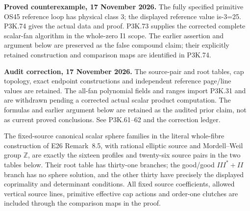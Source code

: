 \begin{theorem}\label{night:P3F.53}
\par\noindent\textbf{Proved counterexample, 17 November 2026.} The fully specified primitive OS45 reference loop has physical class 3; the displayed reference value is-3=25. P3K.74 gives the actual data and proof. P3K.73 supplies the corrected complete scalar-fan algorithm in the whole-zero I1 scope. The earlier assertion and argument below are preserved as the false compound claim; their explicitly retained construction and comparison maps are identified in P3K.74.

\par\noindent\textbf{Audit correction, 17 November 2026.} The source-pair and root tables, cap topology, exact endpoint constructions and independent reference page/line values are retained. The all-fan polynomial fields and ranges import P3K.31 and are withdrawn pending a corrected actual scalar product computation. The formulas and earlier argument below are retained as the audited prior claim, not as current proved conclusions. See P3K.61--62 and the correction ledger.
\medskip


The fixed-source canonical scalar sphere families in the literal
whole-fibre construction of E26 Remark~8.5, with rational elliptic
source and Mordell--Weil group \(\mathbb Z\), are exactly the
sixteen profiles and twenty-six source pairs in the two tables below.
Their root table has thirty-one branches; the good/good
\(III^*+II\) branch has no sphere solution, and the other thirty
have precisely the displayed coprimality and determinant conditions.
All fixed source coefficients, allowed vertical source lines,
primitive effective cap actions and order-one clutches are included
through the comparison maps in the proof.


\end{theorem}
